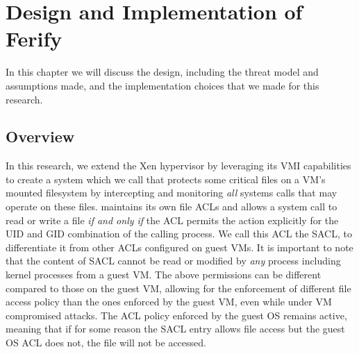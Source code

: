 \acresetall
{}

\chapter{Design and Implementation of Ferify}\label{ch:chapter3}

In this chapter we will discuss the design, including the threat model and assumptions made, and the implementation choices that we made for this research.	

\section{Overview}\label{sec:overview}

\par In this research, we extend the Xen hypervisor by leveraging its \ac{VMI} capabilities to create a system which we call  that protects some critical files on a \ac{VM}'s mounted filesystem by intercepting and monitoring \emph{all} systems calls that may operate on these files.  maintains its own file \acp{ACL} and allows a system call to read or write a file \emph{if and only if} the \ac{ACL} permits the action explicitly for the \ac{UID} and \ac{GID} combination of the calling process. We call this \ac{ACL} the \ac{SACL}, to differentiate it from other \acp{ACL} configured on guest \acp{VM}. It is important to note that the content of \ac{SACL} cannot be read or modified by \emph{any} process including kernel processes from a guest \ac{VM}. The above permissions can be different compared to those on the guest \ac{VM}, allowing for the enforcement of different file access policy than the ones enforced by the guest \ac{VM}, even while under \ac{VM} compromised attacks. The \ac{ACL} policy enforced by the guest \ac{OS} remains active, meaning that if for some reason the \ac{SACL} entry allows file access but the guest \ac{OS} \ac{ACL} does not, the file will not be accessed.


